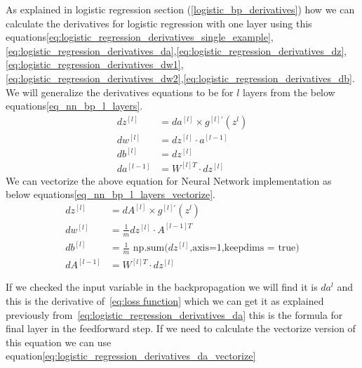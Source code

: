 As explained in logistic regression section (\ref{logistic_bp_derivatives}) how we can calculate the derivatives for logistic regression with one layer using this equations\eqref{eq:logistic_regression_derivatives_single_example},\eqref{eq:logistic_regression_derivatives_da},\eqref{eq:logistic_regression_derivatives_dz},\\
\eqref{eq:logistic_regression_derivatives_dw1},\eqref{eq:logistic_regression_derivatives_dw2},\eqref{eq:logistic_regression_derivatives_db}.\\
We will generalize the derivatives equations to be for $l$ layers from the below equations\eqref{eq_nn_bp_l_layers}.
 \begin{subequations}\label{eq_nn_bp_l_layers}
   \begin{align}
     dz^{[l]} & = da^{[l]} \times g^{[l]'}(z^{l}) \\
     dw^{[l]} & = dz^{[l]} \cdot a^{[l-1]} \\
     db^{[l]} & = dz^{[l]} \\
     da^{[l-1]} & = W^{[l]T} \cdot dz^{[l]} %
 \end{align}
\end{subequations}
We can vectorize the above equation for Neural Network implementation as below equations\eqref{eq_nn_bp_l_layers_vectorize}.
 \begin{subequations}\label{eq_nn_bp_l_layers_vectorize}
   \begin{align}
     dz^{[l]} & = dA^{[l]} \times g^{[l]'}(z^{l}) \\
     dw^{[l]} & = \frac{1}{m} dz^{[l]} \cdot A^{[l-1]T} \\
     db^{[l]} & = \frac{1}{m} \text{ np.sum(}dz^{[l]}\text{,axis=1,keepdims = true)} \\
     dA^{[l-1]} & = W^{[l]T} \cdot dz^{[l]} %
 \end{align}
\end{subequations}

If we checked the input variable in the backpropagation we will find it is $da^{l}$ and this is the derivative of~\eqref{eq:loss function} which we can get it as explained previously from~\eqref{eq:logistic_regression_derivatives_da} this is the formula for final layer in the feedforward step. If we need to calculate the vectorize version of this equation we can use equation\eqref{eq:logistic_regression_derivatives_da_vectorize}

